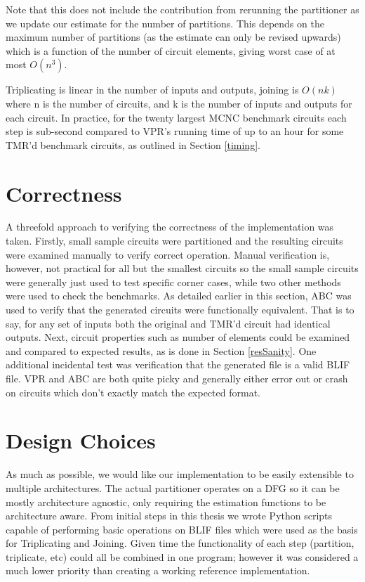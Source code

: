 \documentclass[12pt,final,oneside,a4paper]{dwThesis} %
\begin{document}
   Note that this does not include the contribution from rerunning the partitioner as we update our estimate for the number of partitions.
   This depends on the maximum number of partitions (as the estimate can only be revised upwards) which is a function of the number of circuit elements,
   giving worst case of at most $O(n^3)$. 
   
   
   Triplicating is linear in the number of
   inputs and outputs, joining is $O(nk)$ where n is the number of circuits,
   and k is the number of inputs and outputs for each circuit.  In practice, for the twenty
   largest \gls{MCNC} benchmark circuits each step is sub-second
   compared to \gls{VPR}'s running time of up to an hour for some \gls{TMR}'d
   benchmark circuits, as outlined in Section \ref{timing}.


   \section{Correctness}\label{secTesting}
   A threefold approach to verifying the correctness of
   the implementation was taken.  Firstly, small sample circuits were
   partitioned and the resulting circuits were examined manually to verify
   correct operation. Manual verification is, however, not practical for all
   but the smallest circuits so the small sample circuits were generally just
   used to test specific corner cases, while two other methods were used to
   check the benchmarks. As detailed earlier in this section, \gls{ABC} was
   used to verify that the generated circuits were functionally equivalent.
   That is to say, for any set of inputs both the original and TMR'd circuit
   had identical outputs.  Next, circuit properties such as number of elements
   could be examined and compared to expected results, as is done in Section
   \ref{resSanity}.  One additional incidental test was verification that the
   generated file is a valid \gls{BLIF} file. \gls{VPR} and \gls{ABC} are both
   quite picky and generally either error out or crash on circuits which don't
   exactly match the expected format.



   \section{Design Choices}
   As much as possible, we would like our
   implementation to be easily extensible to multiple architectures. The actual
   partitioner operates on a \gls{DFG} so it can be mostly architecture
   agnostic, only requiring the estimation functions to be architecture aware.
   From initial steps in this thesis we wrote Python scripts capable of
   performing basic operations on \gls{BLIF} files which were used as the basis
   for Triplicating and Joining. Given time the functionality of each step
   (partition, triplicate, etc) could all be combined in one program; however
   it was considered a much lower priority than creating a working reference
   implementation.
\end{document}
